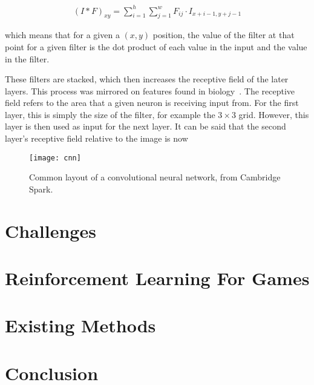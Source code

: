 \begin{align}
    {(I*F)}_{xy} = \sum^{h}_{i=1} \sum^{w}_{j=1} F_{ij} \cdot I_{x+i-1, y+j-1}
\end{align}

which means that for a given a $(x,y)$ position, the value of the filter at that
point for a given filter is the dot product of each value in the input and the
value in the filter.

These filters are stacked, which then increases the receptive field of the later
layers. This process was mirrored on features found in
biology~\cite{hubel1968receptive}. The receptive field refers to the area that a
given neuron is receiving input from. For the first layer, this is simply the
size of the filter, for example the $3 \times 3$ grid. However, this layer is
then used as input for the next layer. It can be said that the second layer's
receptive field relative to the image is now 

\begin{figure}
    \centering
    \texttt{[image: cnn]}
    \caption{Common layout of a convolutional neural network, from
    Cambridge Spark\cite{cnn-layout}.}%
    \label{fig:cnn}
\end{figure}

\section{Challenges}

\section{Reinforcement Learning For Games}

\section{Existing Methods}

\section{Conclusion}

